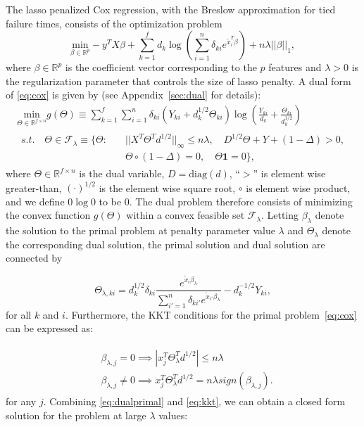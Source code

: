 The lasso penalized Cox regression, with the Breslow approximation \citep{breslow1974covariance} for tied failure times, consists of the optimization problem
\begin{equation}
    \label{eq:cox}
    \underset{\beta\in \mathbb{R}^p}{\mathrm{min}}-y^TX\beta+\sum_{k=1}^f d_k\log\left(\sum_{i=1}^n \delta_{ki} e^{\tilde{x}_i^T\beta}\right)+n\lambda||\beta||_1,
\end{equation}
where $\beta\in\mathbb{R}^p$ is the coefficient vector corresponding to the $p$ features and $\lambda>0$ is the regularization parameter that controls the size of lasso penalty. A dual form of \eqref{eq:cox} is given by (see Appendix~\ref{sec:dual} for details):
\begin{gather}
        \label{eq:dualTheta}
        \underset{\Theta\in \mathbb{R}^{f\times n}}{\mathrm{min}}g(\Theta)\equiv\sum_{k=1}^f\sum_{i=1}^n\delta_{ki}(Y_{ki}+d_k^{1/2}\Theta_{ki})\log\left(\frac{Y_{ki}}{d_k}+\frac{\Theta_{ki}}{d_k^{1/2}}\right)\\
        \begin{aligned}s.t.\quad \Theta\in \mathcal{F}_\lambda\equiv\{\Theta:\quad
            &||X^T\Theta^Td^{1/2}||_\infty\leq n\lambda,\quad D^{1/2}\Theta+Y+(1-\Delta)> 0,\\& \Theta\circ(1-\Delta)=0,\quad \Theta\mathbf{1}=0\}\nonumber,
        \end{aligned}
\end{gather}
where $\Theta\in \mathbb{R}^{f\times n}$ is the dual variable, $D=\textrm{diag}(d)$, ``$>$'' is element wise greater-than, $(\cdot)^{1/2}$ is the element wise square root, $\circ$ is element wise product, and we define $0\log 0$ to be 0. The dual problem therefore consists of minimizing the convex function $g(\Theta)$ within a convex feasible set $\mathcal{F}_\lambda$. Letting $\beta_\lambda$ denote the solution to the primal problem at penalty parameter value $\lambda$ and $\Theta_{\lambda}$ denote the corresponding dual solution, the primal solution and dual solution are connected by

\begin{equation}
    \label{eq:dualprimal}
    \Theta_{\lambda,ki}=d_k^{1/2}\delta_{ki}\frac{e^{\tilde{x}_i\beta_\lambda}}{\sum_{i'=1}^n\delta_{ki'}e^{\tilde{x}_{i'}\beta_\lambda}}-d_k^{-1/2}Y_{ki},
\end{equation}
for all $k$ and $i$. Furthermore, the KKT conditions for the primal problem~\eqref{eq:cox} can be expressed as:

\begin{gather}
    \label{eq:kkt}
    \begin{aligned}&\beta_{\lambda,j}=0\implies\left|x_j^T\Theta_\lambda^Td^{1/2}\right|\leq n\lambda\\
    & \beta_{\lambda,j}\neq0\implies x_j^T\Theta_\lambda^Td^{1/2}= n\lambda\textit{sign}(\beta_{\lambda,j}).
    \end{aligned}
\end{gather}
for any $j$. Combining \eqref{eq:dualprimal} and \eqref{eq:kkt}, we can obtain a closed form solution for the problem at large $\lambda$ values:

